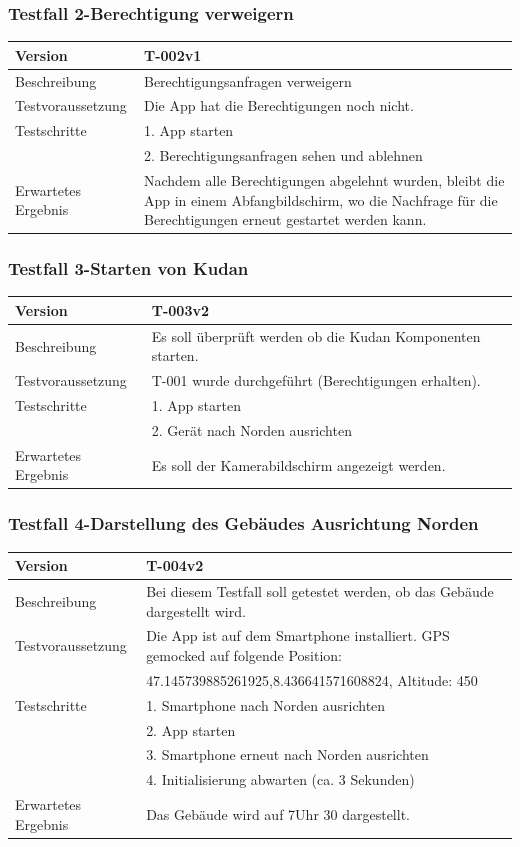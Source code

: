\documentclass[a4paper]{scrreprt}
\begin{document}
\subsubsection{Testfall 2-Berechtigung verweigern}
\begin{tabularx}{\textwidth}{|l|X|}
\hline
	Version &
	T-002v1 \\
\hline
	Beschreibung & Berechtigungsanfragen verweigern \\
\hline
	Testvoraussetzung & Die App hat die Berechtigungen noch nicht. \\
\hline
	Testschritte &
		1. App starten \\ &
		2. Berechtigungsanfragen sehen und ablehnen \\
\hline
	Erwartetes Ergebnis & Nachdem alle Berechtigungen abgelehnt wurden, bleibt die App in einem Abfangbildschirm, wo die Nachfrage für die Berechtigungen erneut gestartet werden kann. \\
\hline
\end{tabularx}
\subsubsection{Testfall 3-Starten von Kudan}
\begin{tabularx}{\textwidth}{|l|X|}
\hline
	Version &
	T-003v2 \\
\hline
	Beschreibung &
	Es soll überprüft werden ob die Kudan Komponenten starten.\\
\hline
	Testvoraussetzung &
	T-001 wurde durchgeführt (Berechtigungen erhalten). \\
\hline
	Testschritte &
		1. App starten \\ &
		2. Gerät nach Norden ausrichten \\
\hline
	Erwartetes Ergebnis &
	Es soll der Kamerabildschirm angezeigt werden. \\
\hline
\end{tabularx}
\subsubsection{Testfall 4-Darstellung des Gebäudes Ausrichtung Norden}
\begin{tabularx}{\textwidth}{|l|X|}
\hline
	Version &
	T-004v2 \\ 
\hline 
	Beschreibung & 
	Bei diesem Testfall soll getestet werden, ob das Gebäude dargestellt wird. \\ 
\hline 
	Testvoraussetzung &
	Die App ist auf dem Smartphone installiert. GPS gemocked auf folgende Position: \\ & 
		47.145739885261925,8.436641571608824, Altitude: 450 \\ 
\hline 
	Testschritte & 
		1. Smartphone nach Norden ausrichten\\ &
		2. App starten\\ &
		3. Smartphone erneut nach Norden ausrichten\\ &
		4. Initialisierung abwarten (ca. 3 Sekunden)\\
\hline
	Erwartetes Ergebnis &
	Das Gebäude wird auf 7Uhr 30 dargestellt. \\
\hline
\end{tabularx}
\end{document}
